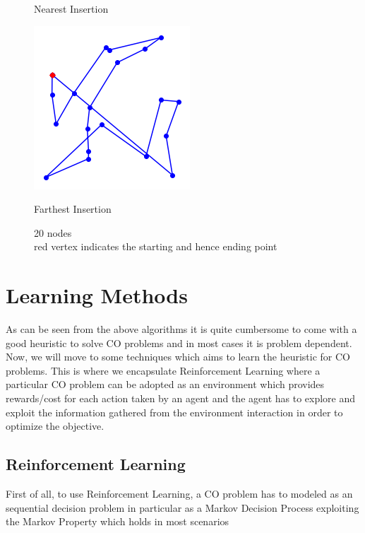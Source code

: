 \documentclass{article}
\theoremstyle{definition}
\begin{document}
\begin{figure}[!htb]
  \caption*{Nearest Insertion}\label{fig:awesome_image2}
\endminipage\hfill
{}%
  \includegraphics[width=0.7\linewidth]{images/fi20.png}
  \caption*{Farthest Insertion}\label{fig:awesome_image3}
\endminipage
\caption{20 nodes\\
red vertex indicates the starting and hence ending point}
\end{figure}
\section{Learning Methods}
As can be seen from the above algorithms it is quite cumbersome to come with a good heuristic to solve CO problems and in most cases it is problem dependent. Now, we will move to some techniques which aims to learn the heuristic for CO problems. This is where we encapsulate Reinforcement Learning where a particular CO problem can be adopted as an environment which provides rewards/cost for each action taken by an agent and the agent has to explore and exploit the information gathered from the environment interaction in order to optimize the objective.
\subsection{Reinforcement Learning}
First of all, to use Reinforcement Learning, a CO problem has to modeled as an sequential decision problem in particular as a Markov Decision Process exploiting the Markov Property which holds in most scenarios
\end{document}
